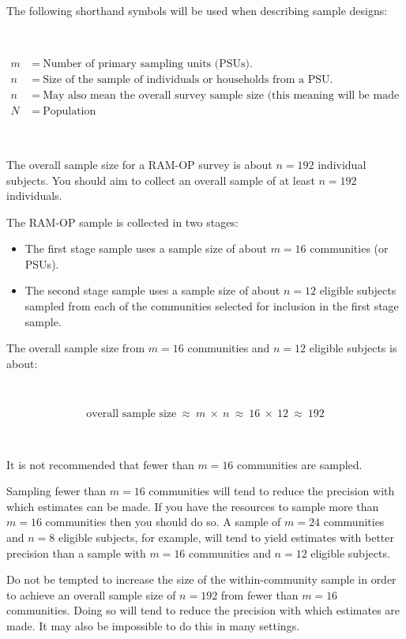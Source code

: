 \documentclass[12pt,a4paper]{book}
\begin{document}
The following shorthand symbols will be used when describing sample designs:

~

\[\begin{aligned}
m & ~ = ~ \text{Number of primary sampling units (PSUs).} \\[5pt]
n & ~ = ~ \text{Size of the sample of individuals or households from a PSU.} \\[5pt]
n & ~ = ~ \text{May also mean the overall survey sample size (this meaning will be made clear in the text).} \\[5pt]
N & ~ = ~ \text{Population}
\end{aligned}\]

~

The overall sample size for a RAM-OP survey is about \(n = 192\) individual subjects. You should aim to collect
an overall sample of at least \(n = 192\) individuals.

The RAM-OP sample is collected in two stages:

\begin{itemize}
\item
  The first stage sample uses a sample size of about \(m = 16\) communities (or PSUs).
\item
  The second stage sample uses a sample size of about \(n = 12\) eligible subjects sampled from each of
  the communities selected for inclusion in the first stage sample.
\end{itemize}

The overall sample size from \(m = 16\) communities and \(n = 12\) eligible subjects is about:

~

\[\text{overall sample size} ~ \approx ~ m ~ \times ~ n ~ \approx ~ 16 ~ \times ~ 12 ~ \approx ~ 192\]

~

It is not recommended that fewer than \(m = 16\) communities are sampled.

Sampling fewer than \(m = 16\) communities will tend to reduce the precision with which estimates can be made. If you have the resources to sample more than \(m = 16\) communities then you should do so. A sample of \(m = 24\) communities and \(n = 8\) eligible subjects, for example, will tend to yield estimates with better precision than a sample with \(m = 16\) communities and \(n = 12\) eligible subjects.

Do not be tempted to increase the size of the within-community sample in order to achieve an overall sample size of \(n = 192\) from fewer than \(m = 16\) communities. Doing so will tend to reduce the precision with which estimates are made. It may also be impossible to do this in many settings.
\end{document}
